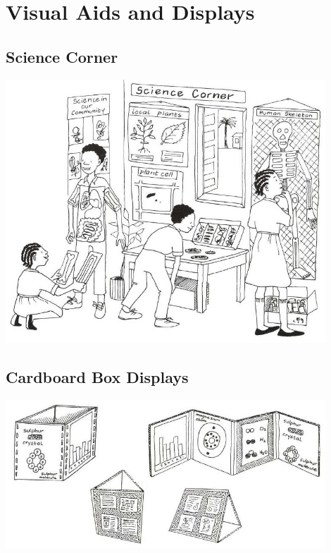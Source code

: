 \chapter{Visual Aids and Displays}


\section{Science Corner}

\begin{center}
\includegraphics[width=12cm]{./img/vso/science-corner.jpg}
\end{center}


\section{Cardboard Box Displays}

\begin{center}
\includegraphics[width=12cm]{./img/vso/cardboard-box.jpg}
\end{center}


